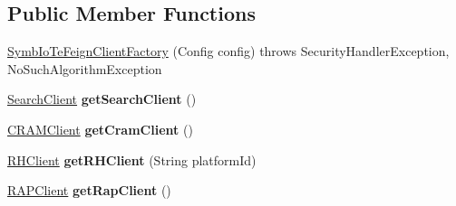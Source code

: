 \subsection*{Public Member Functions}
\begin{DoxyCompactItemize}
\item 
\hyperlink{classeu_1_1h2020_1_1symbiote_1_1client_1_1feign_1_1SymbIoTeFeignClientFactory_a1cbed1295ef0cee5ad7ffda4d4cc7bb4}{Symb\+Io\+Te\+Feign\+Client\+Factory} (Config config)  throws Security\+Handler\+Exception, No\+Such\+Algorithm\+Exception 
\item 
\mbox{\label{classeu_1_1h2020_1_1symbiote_1_1client_1_1feign_1_1SymbIoTeFeignClientFactory_a98107eee462c04eb164064d7fe922205}} 
\hyperlink{interfaceeu_1_1h2020_1_1symbiote_1_1client_1_1interfaces_1_1SearchClient}{Search\+Client} {\bfseries get\+Search\+Client} ()
\item 
\mbox{\label{classeu_1_1h2020_1_1symbiote_1_1client_1_1feign_1_1SymbIoTeFeignClientFactory_ace6b4506d8bb6f2decc20c9b2795eb25}} 
\hyperlink{interfaceeu_1_1h2020_1_1symbiote_1_1client_1_1interfaces_1_1CRAMClient}{C\+R\+A\+M\+Client} {\bfseries get\+Cram\+Client} ()
\item 
\mbox{\label{classeu_1_1h2020_1_1symbiote_1_1client_1_1feign_1_1SymbIoTeFeignClientFactory_a15f84aa369d097980eac9ea2a029b109}} 
\hyperlink{interfaceeu_1_1h2020_1_1symbiote_1_1client_1_1interfaces_1_1RHClient}{R\+H\+Client} {\bfseries get\+R\+H\+Client} (String platform\+Id)
\item 
\mbox{\label{classeu_1_1h2020_1_1symbiote_1_1client_1_1feign_1_1SymbIoTeFeignClientFactory_abe7b8c805344daa34d0bed637e01a569}} 
\hyperlink{interfaceeu_1_1h2020_1_1symbiote_1_1client_1_1interfaces_1_1RAPClient}{R\+A\+P\+Client} {\bfseries get\+Rap\+Client} ()
\item 
\mbox{\label{classeu_1_1h2020_1_1symbiote_1_1client_1_1feign_1_1SymbIoTeFeignClientFactory_a5d57db63c95e9a0752bf7d30352d0c44}} 

\end{DoxyCompactItemize}
